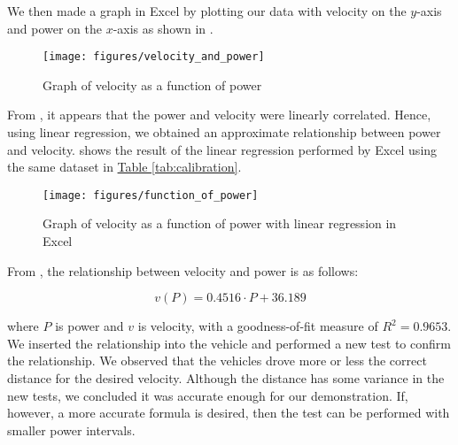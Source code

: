 We then made a graph in Excel by plotting our data with velocity on the $y$-axis and power on the $x$-axis as shown in .

\begin{figure}[h!]
		\centering
	\texttt{[image: figures/velocity\_and\_power]}
	\caption[Graph of velocity as function of power]{Graph of velocity as a function of power}
	\label{fig:graphvelpow}
\end{figure}

From , it appears that the power and velocity were linearly correlated. Hence, using linear regression, we obtained an approximate relationship between power and velocity.  shows the result of the linear regression performed by Excel using the same dataset in \hyperref[tab:calibration]{Table \ref{tab:calibration}}.

\clearpage
\begin{figure}[h!]
	\centering
	\texttt{[image: figures/function\_of\_power]}
	\caption{Graph of velocity as a function of power with linear regression in Excel}
	\label{fig:functionofpower}
\end{figure}

From , the relationship between velocity and power is as follows: 

\begin{equation}
	v(P) = 0.4516\cdot P + 36.189\label{eq:vprelationship}
\end{equation}

where $P$ is power and $v$ is velocity, with a goodness-of-fit measure of $R^2=0.9653$. We inserted the relationship into the vehicle and performed a new test to confirm the relationship. We observed that the vehicles drove more or less the correct distance for the desired velocity. Although the distance has some variance in the new tests, we concluded it was accurate enough for our demonstration. If, however, a more accurate formula is desired, then the test can be performed with smaller power intervals.

